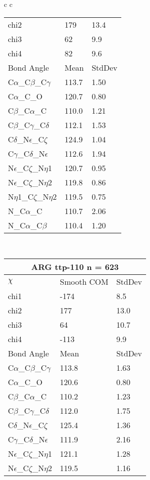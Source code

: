 \begin{longtable}{ c c }
\begin{tabular}{ l l l }
  chi2 & 179 & 13.4 \\ 
  chi3 & 62 & 9.9 \\ 
  chi4 & 82 & 9.6 \\ \midrule
  Bond Angle   & Mean     & StdDev \\ \midrule
  C$\alpha$\_C$\beta$\_C$\gamma$ & 113.7 & 1.50\\
  C$\alpha$\_C\_O & 120.7 & 0.80\\
  C$\beta$\_C$\alpha$\_C & 110.0 & 1.21\\
  C$\beta$\_C$\gamma$\_C$\delta$ & 112.1 & 1.53\\
  C$\delta$\_N$\epsilon$\_C$\zeta$ & 124.9 & 1.04\\
  C$\gamma$\_C$\delta$\_N$\epsilon$ & 112.6 & 1.94\\
  N$\epsilon$\_C$\zeta$\_N$\eta$1 & 120.7 & 0.95\\
  N$\epsilon$\_C$\zeta$\_N$\eta$2 & 119.8 & 0.86\\
  N$\eta$1\_C$\zeta$\_N$\eta$2 & 119.5 & 0.75\\
  N\_C$\alpha$\_C & 110.7 & 2.06\\
  N\_C$\alpha$\_C$\beta$ & 110.4 & 1.20\\
  \bottomrule
  \end{tabular}
  \\
  \begin{tabular}{ l l l }
  \toprule
  \multicolumn{3}{c}{ARG \textbf{ttp-110} n = 623} \\ \toprule
  $\chi$       & Smooth COM & StdDev \\ \midrule
  chi1 & -174 & 8.5 \\ 
  chi2 & 177 & 13.0 \\ 
  chi3 & 64 & 10.7 \\ 
  chi4 & -113 & 9.9 \\ \midrule
  Bond Angle   & Mean     & StdDev \\ \midrule
  C$\alpha$\_C$\beta$\_C$\gamma$ & 113.8 & 1.63\\
  C$\alpha$\_C\_O & 120.6 & 0.80\\
  C$\beta$\_C$\alpha$\_C & 110.2 & 1.23\\
  C$\beta$\_C$\gamma$\_C$\delta$ & 112.0 & 1.75\\
  C$\delta$\_N$\epsilon$\_C$\zeta$ & 125.4 & 1.36\\
  C$\gamma$\_C$\delta$\_N$\epsilon$ & 111.9 & 2.16\\
  N$\epsilon$\_C$\zeta$\_N$\eta$1 & 121.1 & 1.28\\
  N$\epsilon$\_C$\zeta$\_N$\eta$2 & 119.5 & 1.16\\

\end{tabular}
\end{longtable}
